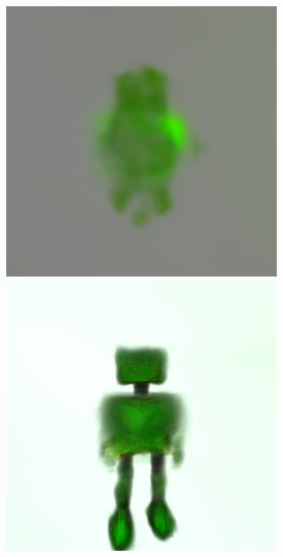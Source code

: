 \begin{figure}[ht]
\begin{subfigure}[b]{0.20\textwidth}
        \caption{}
    \end{subfigure}
    \begin{subfigure}[b]{0.20\textwidth}
        \centering
        \includegraphics[width=\textwidth]{etc/a robot made out of plants/dreamfusion/dreamfusion_plantrobot_1_part1.png}
        \includegraphics[width=\textwidth]{etc/a robot made out of plants/dreamfusion/dreamfusion_plantrobot_5000_part1.png}

\end{subfigure}
\end{figure}
